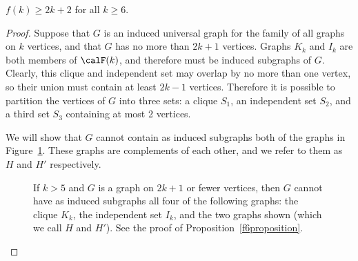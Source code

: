 \begin{proposition}\label{f6proposition}
    $f(k) \geq 2k + 2$ for all $k \geq 6$.
\end{proposition}
\begin{proof}

    Suppose that $G$ is an induced universal graph for the family of all graphs
    on $k$ vertices, and that $G$ has no more than $2k + 1$ vertices.  Graphs
    $K_k$ and $I_k$ are both members of $\calF(k)$, and therefore must
    be induced subgraphs of $G$.  Clearly, this clique and
    independent set may overlap by no more than one vertex, so their union must
    contain at least $2k - 1$ vertices.  Therefore it is possible to partition
    the vertices of $G$ into three sets: a clique $S_1$, an independent set
    $S_2$, and a third set $S_3$ containing at most 2 vertices.

    We will show that $G$ cannot contain as induced subgraphs both
    of the graphs in Figure~\ref{fig:boundproof}.  These graphs are complements
    of each other, and we refer to them as $H$ and $H'$ respectively.

\begin{figure}[htb]
    \centering
{}
\qquad \qquad
{}
\caption{If $k > 5$ and $G$ is a graph on $2k + 1$ or fewer vertices, then
$G$ cannot have as induced subgraphs all four of the following graphs: the
clique $K_k$, the independent set $I_k$, and
    the two graphs shown (which we call $H$ and $H'$). See the proof of Proposition~\ref{f6proposition}.}
\label{fig:boundproof}
\end{figure}


\end{proof}
